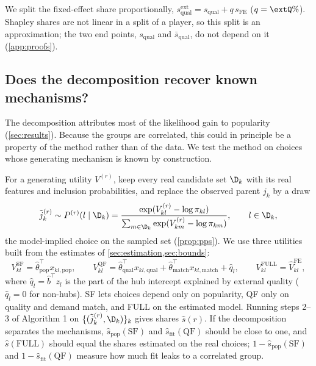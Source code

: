 \noindent We split the fixed-effect share proportionally, $s^{\mathrm{ext}}_{\mathrm{qual}} = s_{\mathrm{qual}} + q\,
s_{\mathrm{FE}}$ ($q = \extQ\%$). Shapley shares are not linear in a split of a player, so this split is an
approximation; the two end points, $s_{\mathrm{qual}}$ and $\bar s_{\mathrm{qual}}$, do not depend on it
(\cref{app:proofs}).

\subsection{Does the decomposition recover known mechanisms?}
\label{sec:validation}

The decomposition attributes most of the likelihood gain to popularity (\cref{sec:results}). Because the groups are
correlated, this could in principle be a property of the method rather than of the data. We test the method on
choices whose generating mechanism is known by construction.

For a generating utility $V^{(r)}$, keep every real candidate set $\D_k$ with its real features and inclusion
probabilities, and replace the observed parent $j_k$ by a draw
\begin{equation}
  \tilde j^{(r)}_k \sim P^{(r)}(l \mid \D_k) = \frac{\exp(V^{(r)}_{kl} - \log \pi_{kl})}{\sum_{m \in \D_k}
  \exp(V^{(r)}_{km} - \log \pi_{km})}, \qquad l \in \D_k,
  \label{eq:sir}
\end{equation}
the model-implied choice on the sampled set (\cref{prop:pps}). We use three utilities built from the estimates of
\cref{sec:estimation,sec:bounds}:
\[
  V^{\mathrm{SF}}_{kl} = \hat\theta_{\mathrm{pop}}^\top x_{kl,\mathrm{pop}}, \qquad
  V^{\mathrm{QF}}_{kl} = \hat\theta_{\mathrm{qual}}^\top x_{kl,\mathrm{qual}} + \hat\theta_{\mathrm{match}}^\top
  x_{kl,\mathrm{match}} + \hat q_l, \qquad
  V^{\mathrm{FULL}}_{kl} = \hat V^{\mathrm{FE}}_{kl},
\]
where $\hat q_l = \hat b^\top z_l$ is the part of the hub intercept explained by external quality ($\hat q_l = 0$ for
non-hubs). SF lets choices depend only on popularity, QF only on quality and demand match, and FULL on the estimated
model. Running steps 2--3 of Algorithm 1 on $\{(\tilde j^{(r)}_k, \D_k)\}_k$ gives shares $\hat s(r)$. If the
decomposition separates the mechanisms, $\hat s_{\mathrm{pop}}(\mathrm{SF})$ and $\hat s_{\mathrm{fit}}(\mathrm{QF})$
should be close to one, and $\hat s(\mathrm{FULL})$ should equal the shares estimated on the real choices; $1 -
\hat s_{\mathrm{pop}}(\mathrm{SF})$ and $1 - \hat s_{\mathrm{fit}}(\mathrm{QF})$ measure how much fit leaks to a
correlated group.

